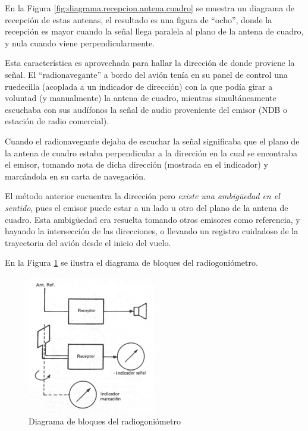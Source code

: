 En la Figura \ref{fig:diagrama.recepcion.antena.cuadro} se muestra un diagrama de recepci\'on de estas antenas, el resultado es una figura de ``ocho'', donde la recepci\'on es mayor cuando la se\~nal llega paralela al plano de la antena de cuadro, y nula cuando viene perpendicularmente.


Esta caracter\'istica es aprovechada para hallar la direcci\'on de donde proviene la se\~nal. El ``radionavegante'' a bordo del avi\'on ten\'ia en su panel de control una ruedecilla (acoplada a un indicador de direcci\'on) con la que pod\'ia girar a voluntad (y manualmente) la antena de cuadro, mientras simult\'aneamente escuchaba con sus aud\'ifonos la se\~nal de audio proveniente del emisor (NDB o estaci\'on de radio comercial).

Cuando el radionavegante dejaba de escuchar la se\~nal significaba que el plano de la antena de cuadro estaba perpendicular a la direcci\'on en la cual se encontraba el emisor, tomando nota de dicha direcci\'on (mostrada en el indicador) y marc\'andola en su carta de navegaci\'on.

El m\'etodo anterior encuentra la direcci\'on pero \emph{existe una ambigüedad en el sentido}, pues el emisor puede estar a un lado u otro del plano de la antena de cuadro. Esta ambigüedad era resuelta tomando otros emisores como referencia, y hayando la intersecci\'on de las direcciones, o llevando un registro cuidadoso de la trayectoria del avi\'on desde el inicio del vuelo.

En la Figura \ref{fig:diag-bloques-radiogoniometro} se ilustra el diagrama de bloques del radiogoni\'ometro.


\begin{figure}[!h]
  \centering
   \includegraphics[width=0.5\textwidth]{06.radionavegacion/Imagenes/06.01.adf/diag-bloques-radiogoniometro.png}
  \caption{Diagrama de bloques del radiogoni\'ometro}
  \label{fig:diag-bloques-radiogoniometro}
\end{figure}


